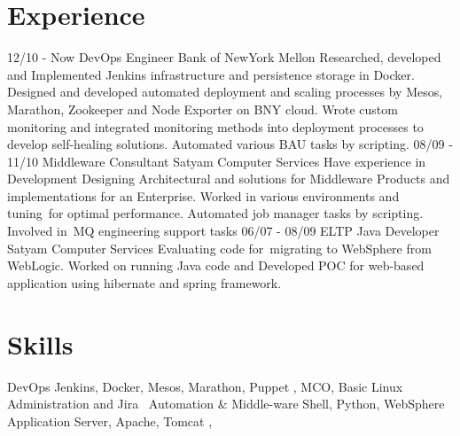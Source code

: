 \documentclass[]{friggeri-cv}
\begin{document}
\section{Experience}
\begin{entrylist}
  \entry
    {12/10 - Now}
    {DevOps Engineer}
    {Bank of NewYork Mellon}
    {Researched, developed and Implemented Jenkins infrastructure and persistence storage in Docker. Designed and developed automated deployment and scaling processes by Mesos, Marathon, Zookeeper and Node Exporter on BNY cloud. Wrote custom monitoring and integrated monitoring methods into deployment processes to develop self-healing solutions. Automated various BAU tasks by scripting. }
  \entry
    {08/09 - 11/10}
    {Middleware Consultant}
    {Satyam Computer Services}
    {Have experience in Development Designing Architectural and solutions for Middleware Products and implementations for an Enterprise. Worked in various environments and tuning for optimal performance. Automated job manager tasks by scripting. Involved in MQ engineering support tasks}
   \entry
    {06/07 - 08/09}
    {ELTP Java Developer}
    {Satyam Computer Services}
    {Evaluating code for migrating to WebSphere from WebLogic. Worked on running Java code and Developed POC for web-based application using hibernate and spring framework.}
   
\end{entrylist}


\section{Skills}
\begin{entrylist}
 \entry
    { }
    {DevOps}
    {}
    {Jenkins, Docker, Mesos, Marathon, Puppet , MCO, Basic Linux Administration and Jira }
 \entry
    { }
    {Automation \& Middle-ware}
    {}
    {Shell, Python, WebSphere Application Server, Apache, Tomcat , }

\end{entrylist}
\end{document}
